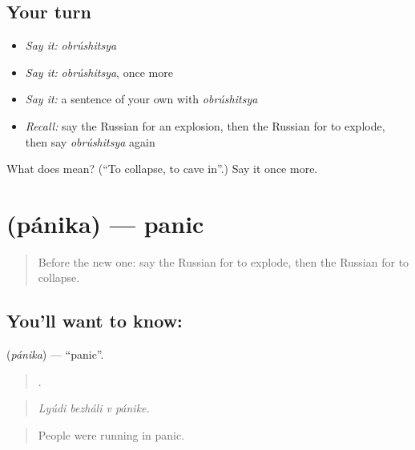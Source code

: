 \subsection*{Your turn}
\begin{itemize}
\raggedright
  \item \emph{Say it:} \emph{obrúshitsya}
  \item \emph{Say it:} \emph{obrúshitsya}, once more
  \item \emph{Say it:} a sentence of your own with \emph{obrúshitsya}
  \item \emph{Recall:} say the Russian for an explosion, then the Russian for to explode, then say \emph{obrúshitsya} again
\end{itemize}

\begin{tcolorbox}[breakable,colback=teal!4,colframe=teal!35!black,title={Before you move on}]
What does  mean? (\textquotedblleft{}To collapse, to cave in\textquotedblright{}.) Say it once more.
\end{tcolorbox}
\section[\texorpdfstring{\ru{паника} (pánika)}{паника (pánika)}]{ (pánika) — panic}

\label{lesson:RU-C301-panika}



\begin{quote}
Before the new one: say the Russian for to explode, then the Russian for to collapse.
\end{quote}

\subsection*{You'll want to know: }
\textbf{} (\emph{pánika}) — \textquotedblleft{}panic\textquotedblright{}.

\begin{quote}
   .
\end{quote}

\begin{quote}
\emph{Lyúdi bezháli v pánike.}
\end{quote}

\begin{quote}
People were running in panic.
\end{quote}

